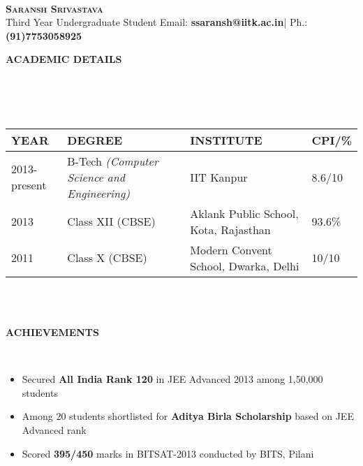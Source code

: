 \documentclass[a4paper,10pt]{article}
\newcommand{\isep}{-2 pt}
\newcommand{\lsep}{-0.5cm}
\newcommand{\resheading}[1]{{\small \colorbox{mygrey}{\begin{minipage}{0.975\textwidth}{\textbf{#1 \vphantom{p\^{E}}}}\end{minipage}}}}
\begin{document}
\hspace{0.5cm}\\[-0.2cm]

\textbf{\LARGE \textsc{Saransh Srivastava}}\\
\indent Third Year Undergraduate Student\hfill
Email: \textbf{ssaransh@iitk.ac.in}|
Ph.: \textbf{(91)7753058925} \\

\resheading{\textbf{ACADEMIC DETAILS} }\\[\lsep]
\\ \\
\indent \begin{tabular}{ L{3cm} L{7cm} L{7cm} L{2cm} }
\hline
\textbf{YEAR} & \textbf{DEGREE} & \textbf{INSTITUTE}  & \textbf{CPI/\%} \\
\hline

2013-present & B-Tech \emph{(Computer Science and Engineering)} & IIT Kanpur & 8.6/10 \\
2013 & Class XII (CBSE) & Aklank Public School, Kota, Rajasthan  & 93.6\% \\
2011 & Class X (CBSE) & Modern Convent School, Dwarka, Delhi & 10/10 \\
\hline
\end{tabular}
\\ \\


\resheading{\textbf{ACHIEVEMENTS} }\\[\lsep]
\begin{itemize}\itemsep \isep
\item \noindent Secured \textbf{All India Rank 120} in JEE Advanced 2013 among 1,50,000 students
\item \noindent Among 20 students shortlisted for \textbf{Aditya Birla Scholarship} based on JEE Advanced rank
\item \noindent Scored \textbf{395/450} marks in BITSAT-2013 conducted by BITS, Pilani
\end{itemize}
\end{document}

